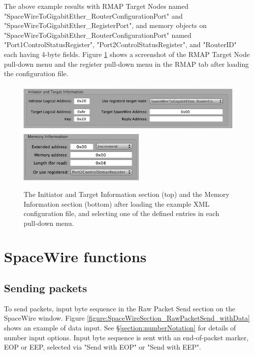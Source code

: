 \documentclass[a4paper,10pt]{article}
\begin{document}
The above example results with RMAP Target Nodes named "SpaceWireToGigabitEther\_RouterConfigurationPort" and "SpaceWireToGigabitEther\_RegisterPort", and memory objects on "SpaceWireToGigabitEther\_RouterConfigurationPort" named "Port1ControlStatusRegister", "Port2ControlStatusRegister", and "RouterID" each having 4-byte fields. Figure \ref{figure:section_pull-down_menus} shows a screenshot of the RMAP Target Node pull-down menu and the register pull-down menu in the RMAP tab after loading the configuration file.
\begin{figure}[htb]
\begin{center}
\includegraphics[height=2.5cm]{figures/SpaceWireRMAPGUI/Section_InitiatorAndTargetInformation_with_registered_RMAPTargetNode.png}\\\vspace{2mm}
\includegraphics[height=2.5cm]{figures/SpaceWireRMAPGUI/Section_MemoryInformation_with_registered_MemoryObject.png}
\caption{The Initiator and Target Information section (top) and the Memory Information section (bottom) after loading the example XML configuration file, and selecting one of the defined entries in each pull-down menu.}
\label{figure:section_pull-down_menus}
\end{center}
\end{figure}



\section{SpaceWire functions}
\subsection{Sending packets}
To send packets, input byte sequence in the Raw Packet Send section on the SpaceWire window.
Figure \ref{figure:SpaceWireSection_RawPacketSend_withData} shows an example of data input.
See \S\ref{section:numberNotation} for details of number input options. Input byte sequence is sent with an end-of-packet marker, EOP or EEP, selected via "Send with EOP" or "Send with EEP".
\end{document}
